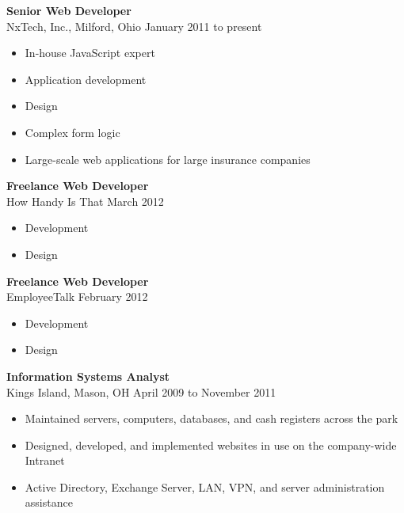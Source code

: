 \documentclass[11pt, line]{res}
\begin{document}
\begin{resume}
				\textbf{Senior Web Developer} \\
				NxTech, Inc.,\; Milford, Ohio
				\hfill January 2011 to present \

				\begin{itemize}
					\item In-house JavaScript expert
					\item Application development
					\item Design
					\item Complex form logic
					\item Large-scale web applications for large insurance companies
				\end{itemize}

				\textbf{Freelance Web Developer} \\
				How Handy Is That
				\hfill March 2012 \

				\begin{itemize}
					\item Development
					\item Design
				\end{itemize}

				\textbf{Freelance Web Developer} \\
				EmployeeTalk
				\hfill February 2012 \

				\begin{itemize}
					\item Development
					\item Design
				\end{itemize}

				\textbf{Information Systems Analyst} \\
				Kings Island,\; Mason, OH
				\hfill April 2009 to November 2011 \

				\begin{itemize}
					\item Maintained servers, computers, databases, and cash registers across the park
					\item Designed, developed, and implemented websites in use on the company-wide Intranet
					\item Active Directory, Exchange Server, LAN, VPN, and server administration assistance
				\end{itemize}
	\end{resume}
\end{document}
